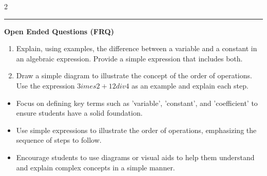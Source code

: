 \documentclass[10pt]{article}
\begin{document}
\begin{multicols}{2}
\begin{enumerate}[label=\textbf{Q\arabic*.}, leftmargin=*, itemsep=6pt, parsep=0pt]
\end{enumerate}
\end{multicols}

\vspace{-0.2cm}
\hrule
\vspace{0.2cm}
\textbf{\small Open Ended Questions (FRQ)}
\begin{enumerate}[label=\textbf{Q\arabic*.}, start=9, itemsep=5pt, topsep=0pt]

  \item \small Explain, using examples, the difference between a variable and a constant in an algebraic expression. Provide a simple expression that includes both. \vspace{2cm}

  \item \small Draw a simple diagram to illustrate the concept of the order of operations. Use the expression $3 	imes 2 + 12 div 4$ as an example and explain each step. \vspace{2cm}

\end{enumerate}

\vfill

\begin{tcolorbox}[colback=blue!5, colframe=mainblue!50, title=\small \textbf{Chef's Tips}, fonttitle=\bfseries, bottom=1mm]
\begin{itemize}[noitemsep, topsep=2pt, leftmargin=0.5cm]
  \item \scriptsize Focus on defining key terms such as 'variable', 'constant', and 'coefficient' to ensure students have a solid foundation.\item \scriptsize Use simple expressions to illustrate the order of operations, emphasizing the sequence of steps to follow.\item \scriptsize Encourage students to use diagrams or visual aids to help them understand and explain complex concepts in a simple manner.
\end{itemize}
\end{tcolorbox}
\end{document}
